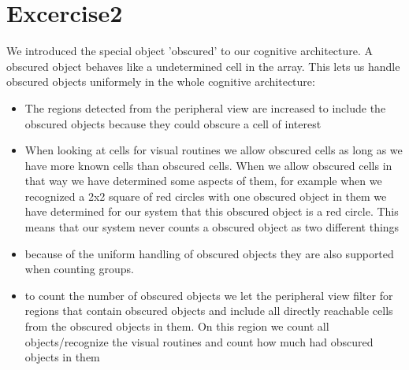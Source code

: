 \documentclass[final,paper=a4,paper=portraitmpagesize=auto,fontsize=11pt,ngerman]{scrartcl}
\begin{document}
\section{Excercise2}
\label{sec-2}
We introduced the special object 'obscured' to our cognitive
architecture. A obscured object behaves like a undetermined 
cell in the array. This lets us handle obscured objects uniformely
in the whole cognitive architecture:
\begin{itemize}
\item The regions detected from the peripheral view are increased to 
include the obscured objects because they could obscure a cell
of interest
\item When looking at cells for visual routines we allow obscured cells
as long as we have more known cells than obscured cells.
When we allow obscured cells in that way we have determined some
aspects of them, for example when we recognized a 2x2 square of 
red circles with one obscured object in them we have determined 
for our system that this obscured object is a red circle. This 
means that our system never counts a obscured object as two 
different things
\item because of the uniform handling of obscured objects they are also
supported when counting groups.
\item to count the number of obscured objects we let the peripheral view
filter for regions that contain obscured objects and include all 
directly reachable cells from the obscured objects in them. 
On this region we count all objects/recognize the visual routines
and count how much had obscured objects in them
\end{itemize}
\end{document}
